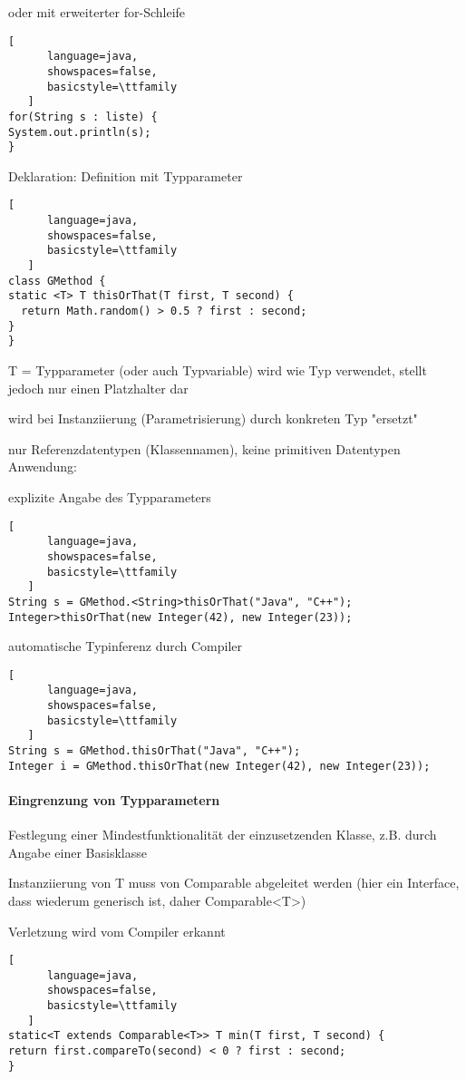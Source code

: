 \documentclass[10pt]{article}
\begin{document}
\begin{itemize*}
oder mit erweiterter for-Schleife
\begin{lstlisting}[
      language=java,
      showspaces=false,
      basicstyle=\ttfamily
   ]
for(String s : liste) {
System.out.println(s);
}
\end{lstlisting}


Deklaration: Definition mit Typparameter
\begin{lstlisting}[
      language=java,
      showspaces=false,
      basicstyle=\ttfamily
   ]
class GMethod {
static <T> T thisOrThat(T first, T second) {
  return Math.random() > 0.5 ? first : second;
}
}
\end{lstlisting}

\begin{itemize*}
  \item T = Typparameter (oder auch Typvariable) wird wie Typ verwendet, stellt jedoch nur einen Platzhalter dar
  \item wird bei Instanziierung (Parametrisierung) durch konkreten Typ "ersetzt"
  \item nur Referenzdatentypen (Klassennamen), keine primitiven Datentypen
  Anwendung:
  \item explizite Angabe des Typparameters
  \begin{lstlisting}[
      language=java,
      showspaces=false,
      basicstyle=\ttfamily
   ]
String s = GMethod.<String>thisOrThat("Java", "C++");
Integer>thisOrThat(new Integer(42), new Integer(23));
\end{lstlisting}
  
  \item automatische Typinferenz durch Compiler
  \begin{lstlisting}[
      language=java,
      showspaces=false,
      basicstyle=\ttfamily
   ]
String s = GMethod.thisOrThat("Java", "C++");
Integer i = GMethod.thisOrThat(new Integer(42), new Integer(23));
\end{lstlisting}
\end{itemize*}


\paragraph{Eingrenzung von Typparametern}
Festlegung einer Mindestfunktionalität der einzusetzenden Klasse, z.B. durch Angabe einer Basisklasse
\begin{itemize*}
  \item Instanziierung von T muss von Comparable abgeleitet werden (hier ein Interface, dass wiederum generisch ist, daher Comparable<T>)
  \item Verletzung wird vom Compiler erkannt
\end{itemize*}
\begin{lstlisting}[
      language=java,
      showspaces=false,
      basicstyle=\ttfamily
   ]
static<T extends Comparable<T>> T min(T first, T second) {
return first.compareTo(second) < 0 ? first : second;
}
\end{lstlisting}


\end{itemize*}
\end{document}
